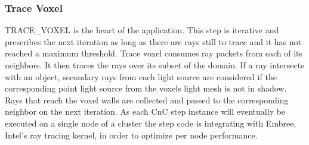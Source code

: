 \subsubsection{Trace Voxel}

TRACE\_VOXEL is the heart of the application.  This step is iterative and prescribes the next iteration as long as there are rays still to trace and it has not reached a maximum threshold.  Trace voxel consumes ray packets from each of its neighbors.  It then traces the rays over its subset of the domain.  If a ray intersects with an object, secondary rays from each light source are considered if the corresponding point light source from the voxels light mesh is not in shadow.  Rays that reach the voxel walls are collected and passed to the corresponding neighbor on the next iteration.  As each CnC step instance will eventually be executed on a single node of a cluster the step code is integrating with Embree, Intel’s ray tracing kernel, in order to optimize per node performance.


